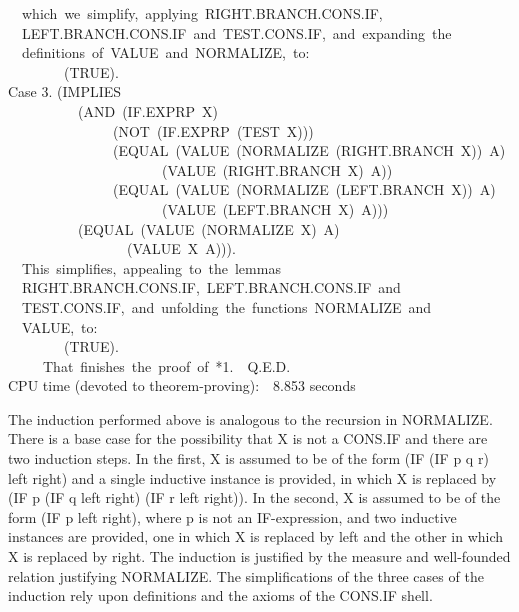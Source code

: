 \documentclass[10pt]{book}
\newenvironment{pubasis}{\begin{flushleft}}{\end{flushleft}}
\begin{document}
\begin{pubasis}
~~which~we~simplify,~applying~RIGHT.BRANCH.CONS.IF,\\
~~LEFT.BRANCH.CONS.IF~and~TEST.CONS.IF,~and~expanding~the\\
~~definitions~of~VALUE~and~NORMALIZE,~to:\\

~~~~~~~~(TRUE).\\

Case 3.	(IMPLIES\\
~~~~~~~~~~(AND~(IF.EXPRP~X)\\
~~~~~~~~~~~~~~~(NOT~(IF.EXPRP~(TEST~X)))\\
~~~~~~~~~~~~~~~(EQUAL~(VALUE~(NORMALIZE~(RIGHT.BRANCH~X))~A)\\
~~~~~~~~~~~~~~~~~~~~~~(VALUE~(RIGHT.BRANCH~X)~A))\\
~~~~~~~~~~~~~~~(EQUAL~(VALUE~(NORMALIZE~(LEFT.BRANCH~X))~A)\\
~~~~~~~~~~~~~~~~~~~~~~(VALUE~(LEFT.BRANCH~X)~A)))\\
~~~~~~~~~~(EQUAL~(VALUE~(NORMALIZE~X)~A)\\
~~~~~~~~~~~~~~~~~(VALUE~X~A))).\\

~~This~simplifies,~appealing~to~the~lemmas\\
~~RIGHT.BRANCH.CONS.IF,~LEFT.BRANCH.CONS.IF~and\\
~~TEST.CONS.IF,~and~unfolding~the~functions~NORMALIZE~and\\
~~VALUE,~to:\\

~~~~~~~~(TRUE).\\

~~~~~That~finishes~the~proof~of~*1.~~Q.E.D.\\

CPU time (devoted to theorem-proving):~~8.853 seconds\\
\end{pubasis}
The induction performed above is analogous to the recursion in NORMALIZE.
There is a base case for the possibility that X is not a CONS.IF and
there are two induction steps.  In the first, X is assumed to be of the
form (IF (IF p q r) left right) and a single inductive instance is provided, in which X is replaced by
(IF p (IF q left right) (IF r left right)).  In the second, X is assumed to be of the
form (IF p left right), where p is not an IF-expression, and two inductive instances are
provided, one in which X is replaced by left and the other in which X is replaced by right.
The induction is justified by the measure and well-founded relation
justifying NORMALIZE.  The simplifications of the three cases of the induction
rely upon definitions and the axioms of the CONS.IF  shell.
\end{document}
